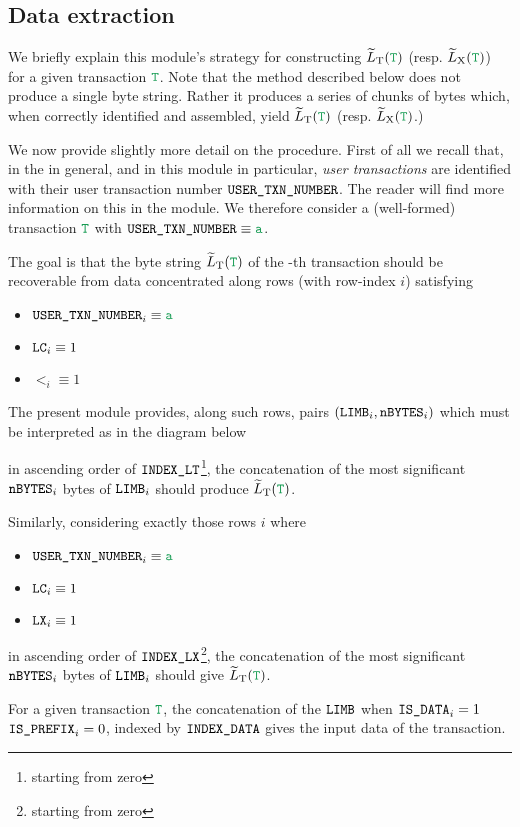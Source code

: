 \subsection{Data extraction}

We briefly explain this module's strategy for constructing $\locLtTildeOfT$ (resp. $\locLxTildeOfT$) for a given transaction $\locTransaction$.
Note that the method described below does not produce a single byte string.
Rather it produces a series of chunks of bytes which, when correctly identified and assembled, yield $\locLtTildeOfT$ (resp. $\locLxTildeOfT$.)

We now provide slightly more detail on the procedure.
First of all we recall that, in the \zkEvm{} in general, and in this module in particular,
\emph{user transactions} are identified with their user transaction number
$\texttt{USER}\texttt{\_}\texttt{TXN\_NUMBER}$.
The reader will find more information on this in the \userTxnDataMod{} module.
We therefore consider a (well-formed) transaction $\locTransaction$ with $\userTransactionNumber \equiv \loc{a}$.

The goal is that the byte string $\locLtTildeOfT$
of the -th transaction
should be recoverable from data concentrated along rows
(with row-index $i$) satisfying
\begin{multicols}{3}
	\begin{itemize}
		\item $\userTransactionNumber _{i} \equiv \loc{a}$
		\item $\texttt{LC}                    _{i} \equiv 1$
		\item $\lt                    _{i} \equiv 1$
	\end{itemize}
\end{multicols}
The present module provides, along such rows,
pairs $(\texttt{LIMB} _{i}, \texttt{nBYTES} _{i})$
which must be interpreted as in the diagram below



in ascending order of $\texttt{INDEX\_LT}$\footnote{starting from zero},
the concatenation of the most significant 
$\texttt{nBYTES} _{i}$ bytes of $\texttt{LIMB} _{i}$ should produce $\locLtTildeOfT$.

Similarly, considering exactly those rows $i$ where
\begin{multicols}{3}
	\begin{itemize}
		\item $\userTransactionNumber _{i} \equiv \loc{a}$
		\item $\texttt{LC}                    _{i} \equiv 1$
		\item $\texttt{LX}                    _{i} \equiv 1$
	\end{itemize}
\end{multicols}
\noindent in ascending order of $\texttt{INDEX\_LX}$\footnote{starting from zero},
the concatenation of the most significant 
$\texttt{nBYTES} _{i}$ bytes of $\texttt{LIMB} _{i}$ should give $\locLtTildeOfT$.

\saNote{} For a given transaction $\locTransaction$,
the concatenation of the
$\texttt{LIMB}$ when
$\texttt{IS\_DATA} _{i} = 1$ \et{}
$\texttt{IS\_PREFIX} _{i} = 0$, indexed by
$\texttt{INDEX\_DATA}$ gives the input data of the transaction.
